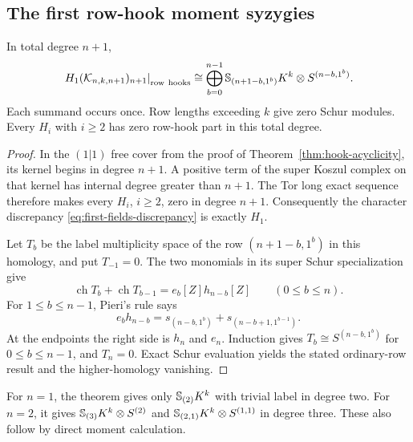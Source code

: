 \subsection{The first row-hook moment syzygies}

\begin{theorem}
\label{thm:first-hook-syzygies}
In total degree $n+1$,
\[
 \left.H_1(\mathcal K_{n,k,n+1})_{n+1}
                 \right|_{\mathrm{row\ hooks}}
  \cong
  \bigoplus_{b=0}^{n-1}
      \mathbb S_{(n+1-b,1^b)}K^k\otimes S^{(n-b,1^b)}.
\]
Each summand occurs once. Row lengths exceeding $k$ give zero
Schur modules. Every $H_i$ with $i\ge2$ has zero row-hook part
in this total degree.
\end{theorem}

\begin{proof}
In the $(1|1)$ free cover from the proof of Theorem~\ref{thm:hook-acyclicity}, its kernel
begins in degree $n+1$. A positive term of the super Koszul
complex on that kernel has internal degree greater than
$n+1$. The Tor long exact sequence therefore makes every
$H_i$, $i\ge2$, zero in degree $n+1$.
Consequently the character discrepancy
\eqref{eq:first-fields-discrepancy} is exactly $H_1$.

Let $T_b$ be the label multiplicity space of the row
$(n+1-b,1^b)$ in this homology, and put $T_{-1}=0$.
The two monomials in its super Schur specialization give
\[
 \operatorname{ch}T_b+\operatorname{ch}T_{b-1}
       =e_b[Z]h_{n-b}[Z]\qquad(0\le b\le n).
\]
For $1\le b\le n-1$, Pieri's rule says
\[
 e_bh_{n-b}
    =s_{(n-b,1^b)}+s_{(n-b+1,1^{b-1})}.
\]
At the endpoints the right side is $h_n$ and $e_n$.
Induction gives $T_b\cong S^{(n-b,1^b)}$ for $0\le b\le n-1$,
and $T_n=0$. Exact Schur evaluation yields the stated
ordinary-row result and the higher-homology vanishing.
\end{proof}

For $n=1$, the theorem gives only $\mathbb S_{(2)}K^k$ with
trivial label in degree two. For $n=2$, it gives
$\mathbb S_{(3)}K^k\otimes S^{(2)}$ and
$\mathbb S_{(2,1)}K^k\otimes S^{(1,1)}$ in degree three.
These also follow by direct moment calculation.

